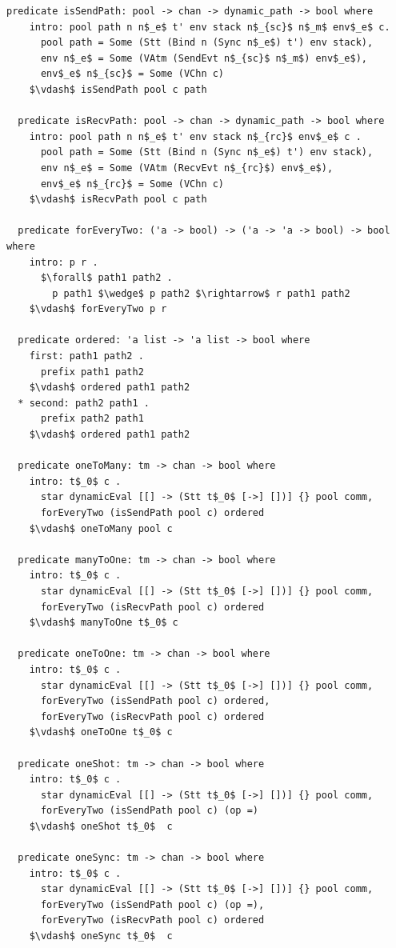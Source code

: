 \documentclass[letterpaper, 11pt]{extarticle}
\begin{document}
\begin{lstlisting}[language=logic, mathescape]
  predicate isSendPath: pool -> chan -> dynamic_path -> bool where
    intro: pool path n n$_e$ t' env stack n$_{sc}$ n$_m$ env$_e$ c.
      pool path = Some (Stt (Bind n (Sync n$_e$) t') env stack),
      env n$_e$ = Some (VAtm (SendEvt n$_{sc}$ n$_m$) env$_e$), 
      env$_e$ n$_{sc}$ = Some (VChn c)
    $\vdash$ isSendPath pool c path

  predicate isRecvPath: pool -> chan -> dynamic_path -> bool where
    intro: pool path n n$_e$ t' env stack n$_{rc}$ env$_e$ c .
      pool path = Some (Stt (Bind n (Sync n$_e$) t') env stack),
      env n$_e$ = Some (VAtm (RecvEvt n$_{rc}$) env$_e$),
      env$_e$ n$_{rc}$ = Some (VChn c)
    $\vdash$ isRecvPath pool c path

  predicate forEveryTwo: ('a -> bool) -> ('a -> 'a -> bool) -> bool where
    intro: p r .
      $\forall$ path1 path2 .
        p path1 $\wedge$ p path2 $\rightarrow$ r path1 path2
    $\vdash$ forEveryTwo p r

  predicate ordered: 'a list -> 'a list -> bool where
    first: path1 path2 .
      prefix path1 path2
    $\vdash$ ordered path1 path2
  * second: path2 path1 .
      prefix path2 path1
    $\vdash$ ordered path1 path2

  predicate oneToMany: tm -> chan -> bool where
    intro: t$_0$ c .
      star dynamicEval [[] -> (Stt t$_0$ [->] [])] {} pool comm,
      forEveryTwo (isSendPath pool c) ordered
    $\vdash$ oneToMany pool c

  predicate manyToOne: tm -> chan -> bool where
    intro: t$_0$ c .
      star dynamicEval [[] -> (Stt t$_0$ [->] [])] {} pool comm,
      forEveryTwo (isRecvPath pool c) ordered
    $\vdash$ manyToOne t$_0$ c

  predicate oneToOne: tm -> chan -> bool where
    intro: t$_0$ c .
      star dynamicEval [[] -> (Stt t$_0$ [->] [])] {} pool comm,
      forEveryTwo (isSendPath pool c) ordered,
      forEveryTwo (isRecvPath pool c) ordered
    $\vdash$ oneToOne t$_0$ c

  predicate oneShot: tm -> chan -> bool where
    intro: t$_0$ c .
      star dynamicEval [[] -> (Stt t$_0$ [->] [])] {} pool comm,
      forEveryTwo (isSendPath pool c) (op =)
    $\vdash$ oneShot t$_0$  c

  predicate oneSync: tm -> chan -> bool where
    intro: t$_0$ c .
      star dynamicEval [[] -> (Stt t$_0$ [->] [])] {} pool comm,
      forEveryTwo (isSendPath pool c) (op =),
      forEveryTwo (isRecvPath pool c) ordered 
    $\vdash$ oneSync t$_0$  c

\end{lstlisting}
\end{document}
